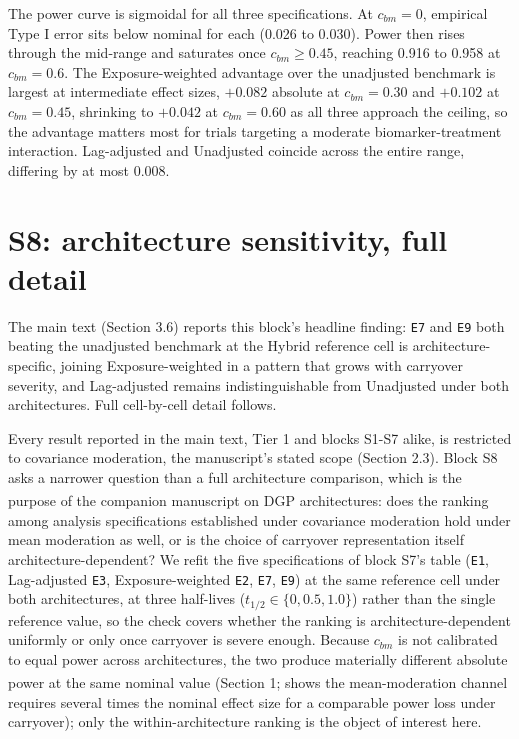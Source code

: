 \documentclass[
  11pt,
]{article}
\begin{document}
The power curve is sigmoidal for all three specifications. At
\(c_{bm} = 0\), empirical Type I error sits below nominal for each
(0.026 to 0.030). Power then rises through the mid-range and
saturates once \(c_{bm} \geq 0.45\), reaching 0.916 to 0.958 at
\(c_{bm} = 0.6\). The Exposure-weighted advantage over the unadjusted
benchmark is largest at intermediate effect sizes, \(+0.082\) absolute
at \(c_{bm} = 0.30\) and \(+0.102\) at \(c_{bm} = 0.45\), shrinking to
\(+0.042\) at \(c_{bm} = 0.60\) as all three approach the ceiling, so
the advantage matters most for trials targeting a moderate
biomarker-treatment interaction. Lag-adjusted and Unadjusted
coincide across the entire range, differing by at most 0.008.

\section{S8: architecture sensitivity, full detail}\label{s8-architecture-sensitivity-full-detail}

The main text (Section 3.6) reports this block's headline finding:
\texttt{E7} and \texttt{E9} both beating the unadjusted benchmark at the Hybrid
reference cell is architecture-specific, joining Exposure-weighted
in a pattern that grows with carryover severity, and Lag-adjusted
remains indistinguishable from Unadjusted under both architectures.
Full cell-by-cell detail follows.

Every result reported in the main text, Tier 1 and blocks S1-S7
alike, is restricted to covariance moderation, the manuscript's
stated scope (Section 2.3). Block S8 asks a narrower question than a
full architecture comparison, which is the purpose of the companion
manuscript on DGP architectures\textsuperscript{}: does the ranking among analysis
specifications established under covariance moderation hold under
mean moderation as well, or is the choice of carryover representation
itself architecture-dependent? We refit the
five specifications of block S7's table (\texttt{E1}, Lag-adjusted \texttt{E3},
Exposure-weighted \texttt{E2}, \texttt{E7}, \texttt{E9}) at the same reference cell under
both architectures, at three half-lives (\(t_{1/2} \in \{0, 0.5,
1.0\}\)) rather than the single reference value, so the check covers
whether the ranking is architecture-dependent uniformly or only once
carryover is severe enough. Because \(c_{bm}\) is not calibrated to
equal power across architectures, the two produce materially
different absolute power at the same nominal value (Section 1;\textsuperscript{} shows the mean-moderation channel
requires several times the nominal effect size for a comparable
power loss under carryover); only the within-architecture ranking is
the object of interest here.
\end{document}
